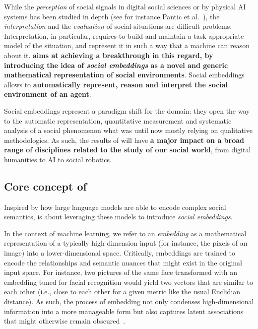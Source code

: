 While the \emph{perception} of social signals in digital social sciences or by
physical AI systems has been studied in depth (see for instance Pantic et
al.~\cite{pantic2011social}), the \emph{interpretation} and the
\emph{evaluation} of social situations are difficult problems.  Interpretation,
in particular, requires to build and maintain a task-appropriate model of the
situation, and represent it in such a way that a machine can reason about it.
\textbf{\project aims at achieving a breakthrough in this regard,
by introducing the idea of \emph{social embeddings} as a novel and generic mathematical
representation of social environments}. Social embeddings allows to
\textbf{automatically represent, reason and interpret the social environment of
an agent}.


Social embeddings represent a paradigm shift for the domain: they open the way
to the automatic representation, quantitative measurement and systematic
analysis of a social phenomenon what was until now mostly relying on qualitative
methodologies. As such, the results of \project will have \textbf{a major impact
on a broad range of disciplines related to the study of our social world}, from
digital humanities to AI to social robotics.


\subsection{Core concept of \project}

Inspired by how large language models are able to encode complex social
semantics, \project is about leveraging these models to introduce
\emph{social embeddings}.

In the context of machine learning, we refer to an \emph{embedding} as a
mathematical representation of a typically high dimension input (for instance,
the pixels of an image) into a lower-dimensional space. Critically, embeddings
are trained to encode the relationships and semantic nuances that might exist in
the original input space. For instance, two pictures of the same face
transformed with an embedding tuned for facial recognition would yield two
vectors that are similar to each other (i.e., close to each other for a given
metric like the usual Euclidian distance). As such, the process of embedding not
only condenses high-dimensional information into a more manageable form but also
captures latent associations that might otherwise remain
obscured~\cite{bengio2009learning}.

